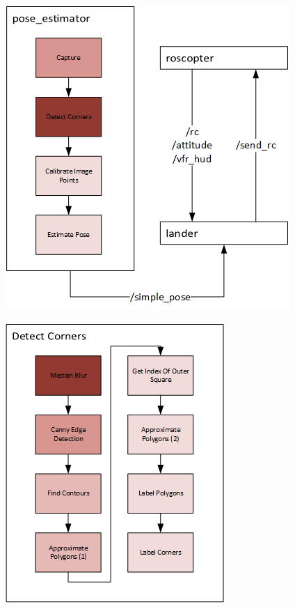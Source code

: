 \documentclass{acm_proc_article-sp}
\begin{document}
\begin{figure}[t]
\centering
\begin{minipage}{.5\textwidth}
  \centering
  \includegraphics[width=.8\linewidth]{images/rosnodes-performance.png}
  \label{fig:flowchart-performance}
\end{minipage}%
\begin{minipage}{.5\textwidth}
  \centering
  \includegraphics[width=.6\linewidth]{images/detectcorners-performance.png}
  \label{fig:detectcorners-performance}
\end{minipage}
\end{figure}
\end{document}
